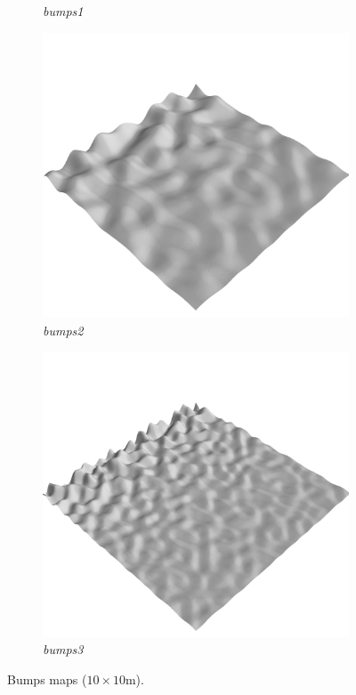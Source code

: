 \documentclass[../document.tex]{subfiles}
\begin{document}
\begin{figure}[H]
\begin{subfigure}[b]{0.32\linewidth}
            \caption{\emph{bumps1}}
            \end{subfigure}    
          \begin{subfigure}[b]{0.32\textwidth}
            \includegraphics[width=\textwidth]{../img/hm3d/bumps2.png}
            \caption{\emph{bumps2}}
        \end{subfigure}    
        \begin{subfigure}[b]{0.32\textwidth}
            \includegraphics[width=\textwidth]{../img/hm3d/bumps3.png}
            \caption{\emph{bumps3}}
        \end{subfigure}    
    \caption{Bumps maps ($10\times10$m).}
\end{figure}
\end{document}
